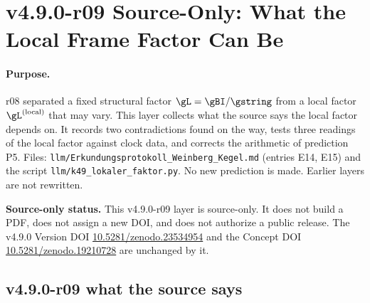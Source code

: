 \clearpage
\section*{v4.9.0-r09 Source-Only: What the Local Frame Factor Can Be}
\label{sec:v490-r09-local-frame-factor}

\paragraph{Purpose.}
r08 separated a fixed structural factor \(\gL=\gBI/\gstring\) from a local factor \(\gL^{(\mathrm{local})}\) that may vary.
This layer collects what the source says the local factor depends on.  It records two contradictions found on the way,
tests three readings of the local factor against clock data, and corrects the arithmetic of prediction P5.  Files:
\texttt{llm/Erkundungsprotokoll\_Weinberg\_Kegel.md} (entries E14, E15) and the script
\texttt{llm/k49\_lokaler\_faktor.py}.  No new prediction is made.  Earlier layers are not rewritten.

\noindent\textbf{Source-only status.}
This v4.9.0-r09 layer is source-only.  It does not build a PDF, does not assign a new DOI,
and does not authorize a public release.  The v4.9.0 Version DOI
\href{https://doi.org/10.5281/zenodo.23534954}{10.5281/zenodo.23534954} and the Concept DOI
\href{https://doi.org/10.5281/zenodo.19210728}{10.5281/zenodo.19210728} are unchanged by it.

\subsection*{v4.9.0-r09 what the source says}
\label{subsec:v490-r09-source}

